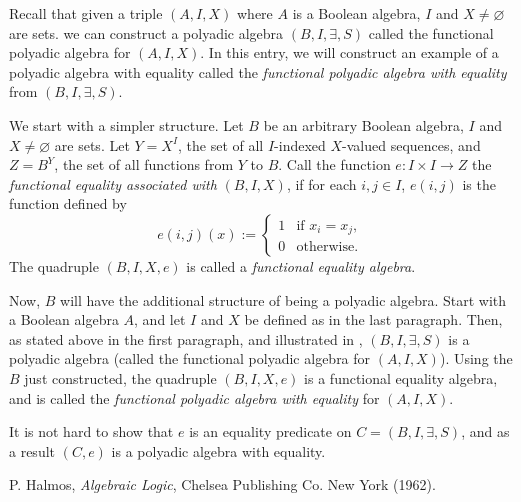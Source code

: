 \documentclass[12pt]{article}
\begin{document}
Recall that given a triple $(A,I,X)$ where $A$ is a Boolean algebra, $I$ and $X\neq \varnothing$ are sets.  we can construct a polyadic algebra $(B,I,\exists,S)$ called the functional polyadic algebra for $(A,I,X)$.  In this entry, we will construct an example of a polyadic algebra with equality called the \emph{functional polyadic algebra with equality} from $(B,I,\exists,S)$.

We start with a simpler structure.  Let $B$ be an arbitrary Boolean algebra, $I$ and $X\neq \varnothing$ are sets.  Let $Y=X^I$, the set of all $I$-indexed $X$-valued sequences, and $Z=B^Y$, the set of all functions from $Y$ to $B$.  Call the function $e:I\times I\to Z$ the \emph{functional equality associated with} $(B,I,X)$, if for each $i,j\in I$, $e(i,j)$ is the function defined by
\begin{displaymath}
e(i,j)(x):=\left\{
\begin{array}{ll}
1 & \textrm{if }x_i=x_j, \\
0 & \textrm{otherwise.}
\end{array}
\right.
\end{displaymath}
The quadruple $(B,I,X,e)$ is called a \emph{functional equality algebra}.

Now, $B$ will have the additional structure of being a polyadic algebra.  Start with a Boolean algebra $A$, and let $I$ and $X$ be defined as in the last paragraph.  Then, as stated above in the first paragraph, and illustrated in , $(B,I,\exists,S)$ is a polyadic algebra (called the functional polyadic algebra for $(A,I,X)$).  Using the $B$ just constructed, the quadruple $(B,I,X,e)$ is a functional equality algebra, and is called the \emph{functional polyadic algebra with equality} for $(A,I,X)$.  

It is not hard to show that $e$ is an equality predicate on $C=(B,I,\exists,S)$, and as a result $(C,e)$ is a polyadic algebra with equality.

\begin{thebibliography}{8}
 P. Halmos, \emph{Algebraic Logic}, Chelsea Publishing Co. New York (1962).
\end{thebibliography}
\end{document}
